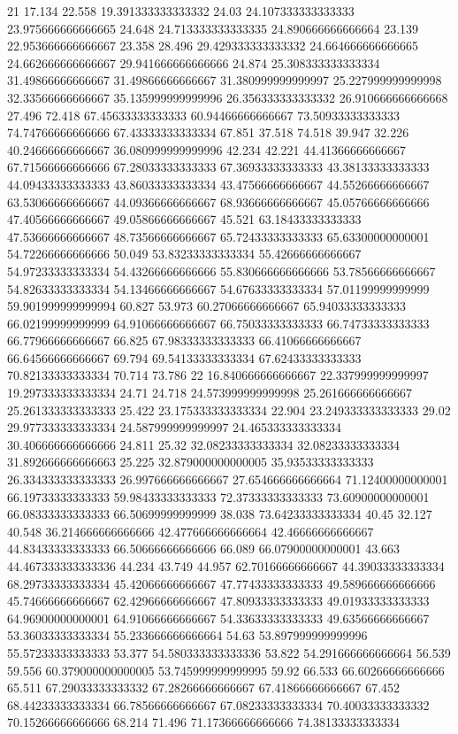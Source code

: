 21 17.134 22.558 19.391333333333332 24.03 24.107333333333333 23.975666666666665 24.648 24.713333333333335 24.890666666666664 23.139 22.953666666666667 23.358 28.496 29.429333333333332 24.664666666666665 24.662666666666667 29.941666666666666 24.874 25.308333333333334 31.49866666666667 31.49866666666667 31.380999999999997 25.227999999999998 32.33566666666667 35.135999999999996 26.356333333333332 26.910666666666668 27.496 72.418 67.45633333333333 60.94466666666667 73.50933333333333 74.74766666666666 67.43333333333334 67.851 37.518 74.518 39.947 32.226 40.24666666666667 36.080999999999996 42.234 42.221 44.41366666666667 67.71566666666666 67.28033333333333 67.36933333333333 43.38133333333333 44.09433333333333 43.86033333333334 43.47566666666667 44.55266666666667 63.53066666666667 44.09366666666667 68.93666666666667 45.05766666666666 47.40566666666667 49.05866666666667 45.521 63.18433333333333 47.53666666666667 48.73566666666667 65.72433333333333 65.63300000000001 54.72266666666666 50.049 53.83233333333334 55.42666666666667 54.97233333333334 54.43266666666666 55.830666666666666 53.78566666666667 54.82633333333334 54.13466666666667 54.67633333333334 57.01199999999999 59.901999999999994 60.827 53.973 60.27066666666667 65.94033333333333 66.02199999999999 64.91066666666667 66.75033333333333 66.74733333333333 66.77966666666667 66.825 67.98333333333333 66.41066666666667 66.64566666666667 69.794 69.54133333333334 67.62433333333333 70.82133333333334 70.714 73.786
22 16.840666666666667 22.337999999999997 19.297333333333334 24.71 24.718 24.573999999999998 25.261666666666667 25.261333333333333 25.422 23.175333333333334 22.904 23.249333333333333 29.02 29.977333333333334 24.587999999999997 24.465333333333334 30.406666666666666 24.811 25.32 32.08233333333334 32.08233333333334 31.892666666666663 25.225 32.879000000000005 35.93533333333333 26.334333333333333 26.997666666666667 27.654666666666664 71.12400000000001 66.19733333333333 59.98433333333333 72.37333333333333 73.60900000000001 66.08333333333333 66.50699999999999 38.038 73.64233333333334 40.45 32.127 40.548 36.214666666666666 42.477666666666664 42.46666666666667 44.83433333333333 66.50666666666666 66.089 66.07900000000001 43.663 44.467333333333336 44.234 43.749 44.957 62.70166666666667 44.39033333333334 68.29733333333334 45.42066666666667 47.77433333333333 49.589666666666666 45.74666666666667 62.42966666666667 47.80933333333333 49.01933333333333 64.96900000000001 64.91066666666667 54.33633333333333 49.63566666666667 53.36033333333334 55.233666666666664 54.63 53.897999999999996 55.57233333333333 53.377 54.580333333333336 53.822 54.291666666666664 56.539 59.556 60.379000000000005 53.745999999999995 59.92 66.533 66.60266666666666 65.511 67.29033333333332 67.28266666666667 67.41866666666667 67.452 68.44233333333334 66.78566666666667 67.08233333333334 70.40033333333332 70.15266666666666 68.214 71.496 71.17366666666666 74.38133333333334
